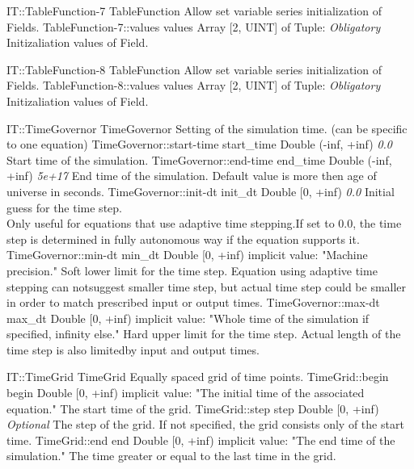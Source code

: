 \begin{RecordType}
	{IT::TableFunction-7}
	{TableFunction}
	{} %
	{} %
	{{{Allow set variable series initialization of Fields.}}}
		\RecKey
			{TableFunction-7::values}
			{values}
			{{Array [2, UINT] of }{Tuple}{: }}
			{ \it{Obligatory} }
			{{{Initizaliation values of Field.}}}
\end{RecordType}
\begin{RecordType}
	{IT::TableFunction-8}
	{TableFunction}
	{} %
	{} %
	{{{Allow set variable series initialization of Fields.}}}
		\RecKey
			{TableFunction-8::values}
			{values}
			{{Array [2, UINT] of }{Tuple}{: }}
			{ \it{Obligatory} }
			{{{Initizaliation values of Field.}}}
\end{RecordType}
\begin{RecordType}
	{IT::TimeGovernor}
	{TimeGovernor}
	{} %
	{} %
	{{{Setting of the simulation time. (can be specific to one equation)}}}
		\RecKey
			{TimeGovernor::start-time}
			{start{\_}time}
			{{Double (-inf, +inf)}}
			{ \it{0.0} }
			{{{Start time of the simulation.}}}
		\RecKey
			{TimeGovernor::end-time}
			{end{\_}time}
			{{Double (-inf, +inf)}}
			{ \it{5e+17} }
			{{{End time of the simulation. Default value is more then age of universe in seconds.}}}
		\RecKey
			{TimeGovernor::init-dt}
			{init{\_}dt}
			{{Double [0, +inf)}}
			{ \it{0.0} }
			{{{Initial guess for the time step.}\\{
Only useful for equations that use adaptive time stepping.If set to 0.0, the time step is determined in fully autonomous way if the equation supports it.}}}
		\RecKey
			{TimeGovernor::min-dt}
			{min{\_}dt}
			{{Double [0, +inf)}}
			{implicit value: "{Machine precision.}"}
			{{{Soft lower limit for the time step. Equation using adaptive time stepping can notsuggest smaller time step, but actual time step could be smaller in order to match prescribed input or output times.}}}
		\RecKey
			{TimeGovernor::max-dt}
			{max{\_}dt}
			{{Double [0, +inf)}}
			{implicit value: "{Whole time of the simulation if specified, infinity else.}"}
			{{{Hard upper limit for the time step. Actual length of the time step is also limitedby input and output times.}}}
\end{RecordType}
\begin{RecordType}
	{IT::TimeGrid}
	{TimeGrid}
	{} %
	{} %
	{{{Equally spaced grid of time points.}}}
		\RecKey
			{TimeGrid::begin}
			{begin}
			{{Double [0, +inf)}}
			{implicit value: "{The initial time of the associated equation.}"}
			{{{The start time of the grid.}}}
		\RecKey
			{TimeGrid::step}
			{step}
			{{Double [0, +inf)}}
			{ \it{Optional} }
			{{{The step of the grid. If not specified, the grid consists only of the start time.}}}
		\RecKey
			{TimeGrid::end}
			{end}
			{{Double [0, +inf)}}
			{implicit value: "{The end time of the simulation.}"}
			{{{The time greater or equal to the last time in the grid.}}}
\end{RecordType}
